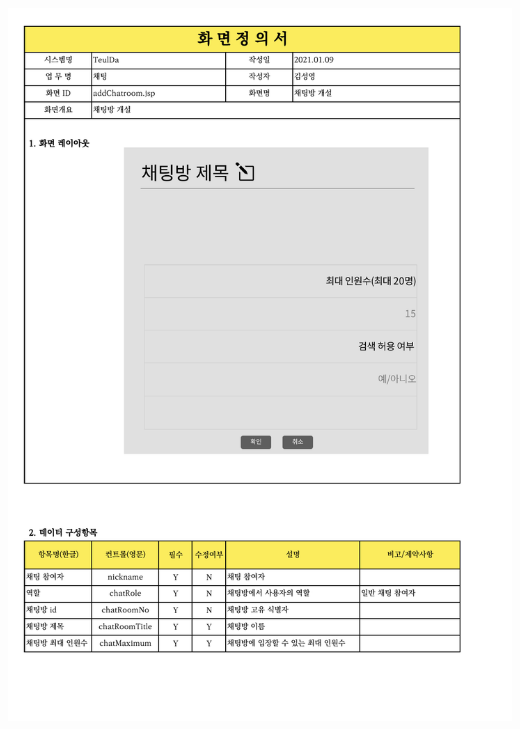 {{{{{{{{{{{{{{{{{{{{{{{{{{{{{{{{{{{{{{{{{{{{{{{{{{{{{{{{{{{{{{{{{\includegraphics[width=20cm]{./Figure/Analysis/Display/chat/chat_04.pdf} \\
}}}}}}}}}}}}}}}}}}}}}}}}}}}}}}}}}}}}}}}}}}}}}}}}}}}}}}}}}}}}}}}}}

